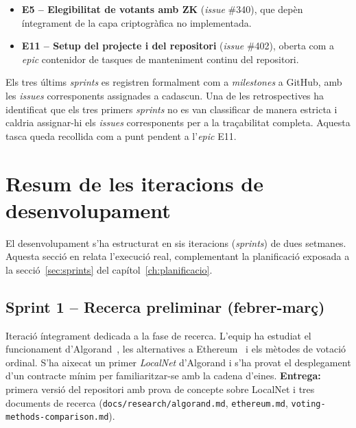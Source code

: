 \begin{itemize}
    \item \textbf{E5 -- Elegibilitat de votants amb \ac{ZK}} (\emph{issue} \#340), que depèn íntegrament de la capa
    criptogràfica no implementada.

    \item \textbf{E11 -- Setup del projecte i del repositori} (\emph{issue} \#402), oberta com a \emph{epic} contenidor
    de tasques de manteniment continu del repositori.
\end{itemize}

Els tres últims \emph{sprints} es registren formalment com a \emph{milestones} a GitHub, amb les \emph{issues}
corresponents assignades a cadascun.
Una de les retrospectives ha identificat que els tres primers \emph{sprints} no es van classificar de manera estricta i
caldria assignar-hi els \emph{issues} corresponents per a la traçabilitat completa.
Aquesta tasca queda recollida com a punt pendent a l'\emph{epic} E11.



\section{Resum de les iteracions de desenvolupament}
\label{sec:iteracions}

El desenvolupament s'ha estructurat en sis iteracions (\emph{sprints}) de dues setmanes.
Aquesta secció en relata l'execució real, complementant la planificació exposada a la secció~\ref{sec:sprints} del
capítol~\ref{ch:planificacio}.

\subsection{Sprint 1 -- Recerca preliminar (febrer-març)}
\label{subsec:sprint-1----recerca-preliminar-(febrer-marc)}

Iteració íntegrament dedicada a la fase de recerca.
L'equip ha estudiat el funcionament d'Algorand~\cite{chen2017algorand,algorandfoundation2024algokit}, les alternatives a
Ethereum~\cite{buterin2014ethereum} i els mètodes de votació ordinal.
S'ha aixecat un primer \emph{LocalNet} d'Algorand i s'ha provat el desplegament d'un contracte mínim per
familiaritzar-se amb la cadena d'eines.
\textbf{Entrega:} primera versió del repositori amb prova de concepte sobre LocalNet i tres documents de recerca
(\texttt{docs/research/algorand.md}, \texttt{ethereum.md}, \texttt{voting-methods-comparison.md}).

